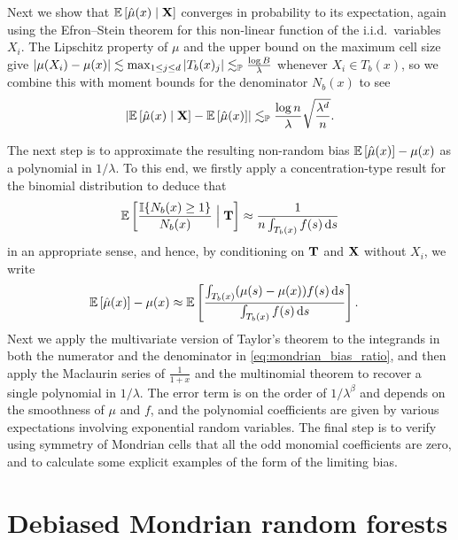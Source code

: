 Next we show that $\E \left[ \hat \mu(x) \mid \bX \right]$ converges in
probability to its expectation, again using the Efron--Stein theorem for this
non-linear function of the i.i.d.\ variables $X_i$. The Lipschitz property of
$\mu$ and the upper bound on the maximum cell size give
$|\mu(X_i) - \mu(x)| \lesssim \max_{1 \leq j \leq d} |T_b(x)_j|
\lesssim_\P \frac{\log B}{\lambda}$
whenever $X_i \in T_b(x)$,
so we combine this with moment bounds for the denominator $N_b(x)$ to see
%
\begin{align*}
  \left|
  \E \left[ \hat \mu(x) \mid \bX \right]
  - \E \left[ \hat \mu(x) \right]
  \right|
  \lesssim_\P
  \frac{\log n}{\lambda} \sqrt{\frac{\lambda^d}{n}}.
\end{align*}

The next step is to approximate the resulting non-random bias
$\E \left[ \hat \mu(x) \right] - \mu(x)$ as a polynomial in $1/\lambda$.
To this end, we firstly apply a concentration-type result for the binomial
distribution to deduce that
%
\begin{align*}
  \E \left[ \frac{\I\{N_b(x) \geq 1\}}{N_b(x)} \Bigm| \bT \right]
  \approx \frac{1}{n \int_{T_b(x)} f(s) \diff s}
\end{align*}
%
in an appropriate sense, and hence,
by conditioning on $\bT$ and $\bX$ without $X_i$, we write
%
\begin{align}
  \label{eq:mondrian_bias_ratio}
  \E \left[ \hat \mu(x) \right] - \mu(x)
  &\approx
  \E \left[
    \frac{\int_{T_b(x)} (\mu(s) - \mu(x)) f(s) \diff s}
    {\int_{T_b(x)} f(s) \diff s}
  \right].
\end{align}
%
Next we apply the multivariate version of Taylor's theorem to the integrands in
both the numerator and the denominator in \eqref{eq:mondrian_bias_ratio}, and
then apply
the Maclaurin series of $\frac{1}{1+x}$ and the multinomial theorem to recover
a single polynomial in $1/\lambda$. The error term is on the order of
$1/\lambda^\beta$ and depends on the smoothness of $\mu$ and $f$, and the
polynomial coefficients are given by various expectations involving exponential
random variables. The final step is to verify using symmetry of Mondrian cells
that all the odd monomial coefficients are zero, and to calculate some explicit
examples of the form of the limiting bias.

\section{Debiased Mondrian random forests}%
\label{sec:mondrian_debiased}

